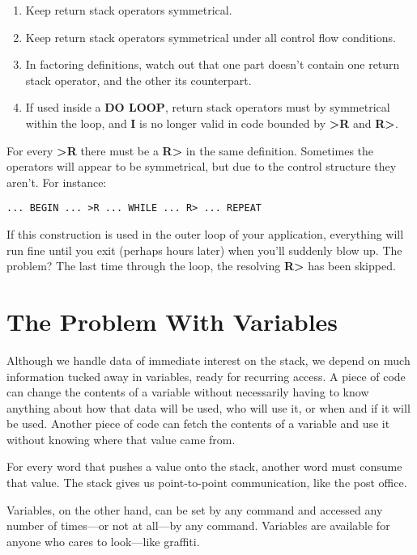 \begin{tip}
\begin{enumerate}
\item Keep return stack operators symmetrical.
\item Keep return stack operators symmetrical under all control flow
   conditions.
\item In factoring definitions, watch out that one part doesn't contain one
   return stack operator, and the other its counterpart.
\item If used inside a \textbf{DO LOOP}, return stack operators must by symmetrical
   within the loop, and \textbf{I} is no longer valid in code bounded by
   \textbf{>R} and \textbf{R>}.
\end{enumerate}
\end{tip}
For every \textbf{>R} there must be a \textbf{R>} in the same definition. Sometimes
the operators will appear to be symmetrical, but due to the control structure
they aren't. For instance:

\begin{verbatim}
... BEGIN ... >R ... WHILE ... R> ... REPEAT
\end{verbatim}

If this construction is used in the outer loop of your application,
everything will run fine until you exit (perhaps hours later) when you'll
suddenly blow up. The problem? The last time through the loop, the
resolving \textbf{R>} has been skipped.

\section{The Problem With Variables}

Although we handle data of immediate interest on the stack, we depend
on much information tucked away in variables, ready for recurring access.
A piece of code can change the contents of a variable without
necessarily having to know anything about how that data will be used,
who will use it, or when and if it will be used. Another piece of code can
fetch the contents of a variable and use it without knowing where that
value came from.

For every word that pushes a value onto the stack, another word
must consume that value. The stack gives us point-to-point communication,
like the post office.

Variables, on the other hand, can be set by any command and accessed
any number of times---or not at all---by any command. Variables
are available for anyone who cares to look---like graffiti.

